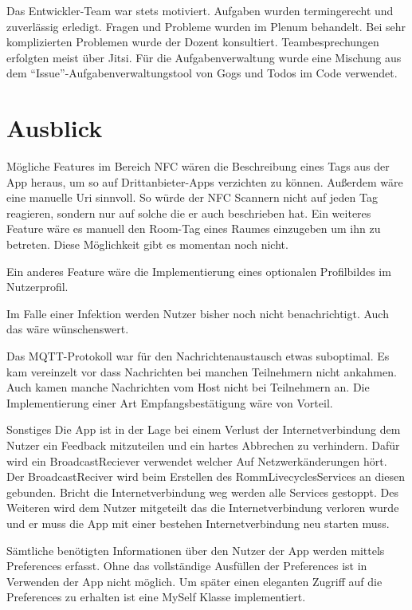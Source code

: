 Das Entwickler-Team war stets motiviert. Aufgaben wurden termingerecht und zuverlässig erledigt.
Fragen und Probleme wurden im Plenum behandelt.
Bei sehr komplizierten Problemen wurde der Dozent konsultiert.
Teambesprechungen erfolgten meist über Jitsi.
Für die Aufgabenverwaltung wurde eine Mischung aus dem ``Issue''-Aufgabenverwaltungstool von Gogs und Todos im Code verwendet.
\section{Ausblick}
\label{sec:Ausblick}
Mögliche Features im Bereich NFC wären die Beschreibung eines Tags aus der App heraus, um so auf Drittanbieter-Apps verzichten zu können. 
Außerdem wäre eine manuelle Uri sinnvoll. So würde der NFC Scannern nicht auf jeden Tag reagieren, sondern nur auf solche die er auch beschrieben hat. 
Ein weiteres Feature wäre es manuell den Room-Tag eines Raumes einzugeben um ihn zu betreten. Diese Möglichkeit gibt es momentan noch nicht.

Ein anderes Feature wäre die Implementierung eines optionalen Profilbildes im Nutzerprofil.

Im Falle einer Infektion werden Nutzer bisher noch nicht benachrichtigt. Auch das wäre wünschenswert.

Das MQTT-Protokoll war für den Nachrichtenaustausch etwas suboptimal. Es kam vereinzelt vor dass Nachrichten bei manchen Teilnehmern nicht ankahmen. Auch kamen manche Nachrichten vom Host nicht bei Teilnehmern an. Die Implementierung einer Art Empfangsbestätigung wäre von Vorteil.

Sonstiges
Die App ist in der Lage bei einem Verlust der Internetverbindung dem Nutzer ein Feedback mitzuteilen und ein hartes Abbrechen zu verhindern. Dafür wird ein BroadcastReciever verwendet welcher Auf Netzwerkänderungen hört. Der BroadcastReciver wird beim Erstellen des RommLivecyclesServices an diesen gebunden. Bricht die Internetverbindung weg werden alle Services gestoppt. Des Weiteren wird dem Nutzer mitgeteilt das die Internetverbindung verloren wurde und er muss die App mit einer bestehen Internetverbindung neu starten muss.

Sämtliche benötigten Informationen über den Nutzer der App werden mittels Preferences erfasst. Ohne das vollständige Ausfüllen der Preferences ist in Verwenden der App nicht möglich. Um später einen eleganten Zugriff auf die Preferences zu erhalten ist eine MySelf Klasse implementiert.

